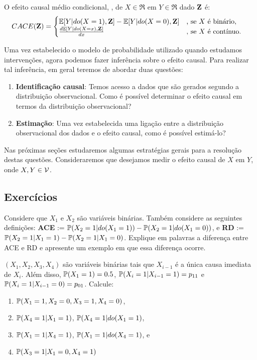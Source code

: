\begin{definition}
 \label{def:cace}
 O efeito causal médio condicional, \CACE,
 de $X \in \Re$ em $Y \in \Re$ dado $\Z$ é:
 \begin{align*}
  \CACE(\Z) &=
  \begin{cases}
   \E[Y|do(X=1),\Z] - \E[Y|do(X=0),\Z]
   & \text{, se $X$ é binário}, \\
   \frac{d\E[Y|do(X=x),\Z]}{dx}
   & \text{, se $X$ é contínuo}.
  \end{cases}
 \end{align*}
\end{definition}

Uma vez estabelecido o modelo de probabilidade
utilizado quando estudamos intervenções,
agora podemos fazer inferência sobre o efeito causal.
Para realizar tal inferência, 
em geral teremos de abordar duas questões:

\begin{enumerate}
 \item \textbf{Identificação causal}: Temos acesso a dados que 
 são gerados segundo a distribuição observacional.
 Como é possível determinar o efeito causal
 em termos da distribuição observacional?
 
 \item \textbf{Estimação}: Uma vez estabelecida 
 uma ligação entre a distribuição observacional dos dados e
 o efeito causal, como é possível estimá-lo?
\end{enumerate}

Nas próximas seções estudaremos 
algumas estratégias gerais para 
a resolução destas questões.
Consideraremos que desejamos medir
o efeito causal de $X$ em $Y$, 
onde $X, Y \in \sV$.

\subsection{Exercícios}

\begin{exercise}
 Considere que $X_1$ e $X_2$ são variáveis binárias.
 Também considere as seguintes definições:
 \textbf{ACE} := $\P(X_2=1|do(X_1=1))-\P(X_2=1|do(X_1=0))$, e
 \textbf{RD} := $\P(X_2=1|X_1=1)-\P(X_2=1|X_1=0)$.
 Explique em palavras a diferença entre ACE e RD e
 apresente um exemplo em que essa diferença ocorre.
\end{exercise}

\begin{exercise}
 $(X_1,X_2,X_3,X_4)$ são 
 variáveis binárias tais que
 $X_{i-1}$ é a única causa imediata de $X_i$.
 Além disso, $\P(X_1=1)=0.5$,
 $\P(X_i=1|X_{i-1}=1)=p_{11}$ e
 $\P(X_i=1|X_{i-1}=0)=p_{01}$.
 Calcule:
 \begin{enumerate}[label=(\alph*)]
  \item $\P(X_1=1,X_2=0,X_3=1,X_4=0)$,
  \item $\P(X_4=1|X_1=1)$, $\P(X_4=1|do(X_1=1)$, 
  \item $\P(X_1=1|X_4=1)$, $\P(X_1=1|do(X_4=1)$, e
  \item $\P(X_3=1|X_1=0,X_4=1)$
 \end{enumerate}
\end{exercise}

